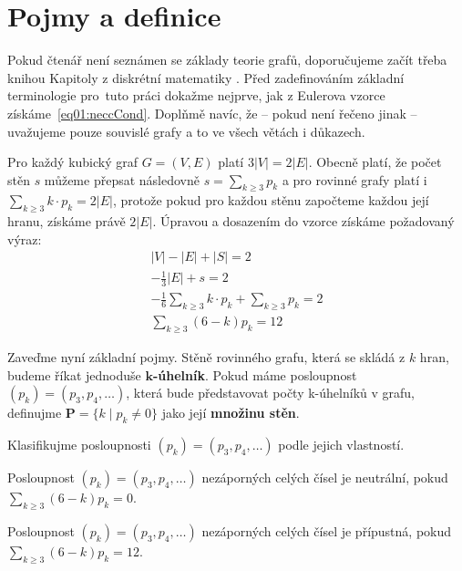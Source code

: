 
\chapter{Pojmy a definice}

Pokud čtenář není seznámen se základy teorie grafů, doporučujeme začít třeba knihou Kapitoly z diskrétní matematiky \cite{Matousek}. Před zadefinováním základní terminologie pro~tuto práci dokažme nejprve, jak z Eulerova vzorce získáme~\eqref{eq01:neccCond}. Doplňmě navíc, že -- pokud není řečeno jinak -- uvažujeme pouze souvislé grafy a to ve všech větách i důkazech.

\begin{dukaz}
Pro každý kubický graf $G = (V,E)$ platí $3 |V| = 2 |E|$. Obecně platí, že počet stěn $s$ můžeme přepsat následovně $s = \sum_{k \geq 3}{p_k}$ a pro rovinné grafy platí i~$ \sum_{k \geq 3}{k \cdot p_k}= 2|E|$, protože pokud pro každou stěnu započteme každou její hranu, získáme právě $2|E|$. Úpravou a dosazením do vzorce získáme požadovaný výraz: 
\begin{align*}
|V|-|E|+|S|=2 \\ -\frac{1}{3} |E| + s = 2 \\
-\frac{1}{6} \sum_{k \geq 3}{k \cdot p_k} + \sum_{k \geq 3}{p_k} = 2 \\ 
\sum_{k \geq 3}{(6-k)p_k}=12
\end{align*}
\end{dukaz}

Zaveďme nyní základní pojmy. Stěně rovinného grafu, která se skládá z $k$ hran, budeme říkat jednoduše \textbf{$\boldsymbol{k}$-úhelník}. Pokud máme posloupnost $(p_k) = (p_3,p_4,\dots)$, která bude představovat počty k-úhelníků v grafu, definujme $\boldsymbol{P} = \lbrace k \mid p_k \neq 0 \rbrace$ jako její \textbf{množinu stěn}.

Klasifikujme posloupnosti $(p_k) = (p_3,p_4,\dots)$ podle jejich vlastností.

\begin{definice}\label{def01:neutralni}
Posloupnost $(p_k) = (p_3,p_4,\dots)$ nezáporných celých čísel je neutrální, pokud $\sum_{k \geq 3}{(6-k)p_k}=0$.
\end{definice}

\begin{definice}\label{def01:pripustna}
Posloupnost $(p_k) = (p_3,p_4,\dots)$ nezáporných celých čísel je přípustná, pokud $\sum_{k \geq 3}{(6-k)p_k}=12$.
\end{definice}

